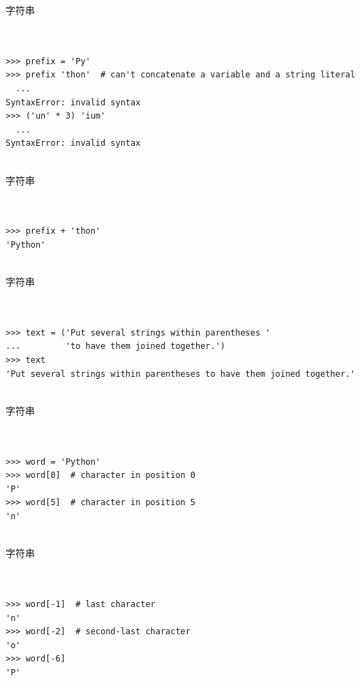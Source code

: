 \documentclass{beamer}
\begin{document}
\begin{frame}[t,fragile]{字符串}


\begin{verbatim}


>>> prefix = 'Py'
>>> prefix 'thon'  # can't concatenate a variable and a string literal
  ...
SyntaxError: invalid syntax
>>> ('un' * 3) 'ium'
  ...
SyntaxError: invalid syntax


\end{verbatim}


\end{frame}


\begin{frame}[t,fragile]{字符串}


\begin{verbatim}


>>> prefix + 'thon'
'Python'


\end{verbatim}


\end{frame}


\begin{frame}[t,fragile]{字符串}


\begin{verbatim}


>>> text = ('Put several strings within parentheses '
...         'to have them joined together.')
>>> text
'Put several strings within parentheses to have them joined together.'


\end{verbatim}


\end{frame}



\begin{frame}[t,fragile]{字符串}


\begin{verbatim}


>>> word = 'Python'
>>> word[0]  # character in position 0
'P'
>>> word[5]  # character in position 5
'n'


\end{verbatim}


\end{frame}



\begin{frame}[t,fragile]{字符串}


\begin{verbatim}


>>> word[-1]  # last character
'n'
>>> word[-2]  # second-last character
'o'
>>> word[-6]
'P'


\end{verbatim}


\end{frame}
\end{document}

